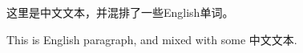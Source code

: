 \documentclass[a4paper,10pt]{article}
\begin{document}
    这里是中文文本，并混排了一些English单词。
    
    This is English paragraph, and mixed with some 中文文本.
    
\end{document}
